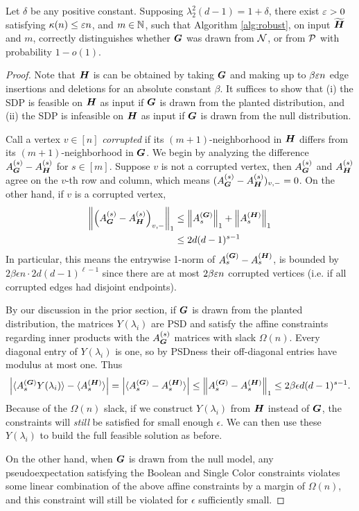\begin{theorem}
    Let $\delta$ be any positive constant. Supposing $\lambda^2_2(d-1) = 1+\delta$, there exist $\varepsilon > 0$ satisfying $\kappa(n)\le\varepsilon n$, and $m \in \mathbb{N}$, such that Algorithm \ref{alg:robust}, on input $\widetilde{\boldsymbol{H}}$ and $m$, correctly distinguishes whether $\boldsymbol{G}$ was drawn from $\mathcal{N}$, or from $\mathcal{P}$ with probability $1-o(1)$.
\end{theorem}
\begin{proof}
	Note that $\boldsymbol{H}$ is can be obtained by taking $\boldsymbol{G}$ and making up to $\beta\varepsilon n$ edge insertions and deletions for an absolute constant $\beta$. It suffices to show that (i) the SDP is feasible on $\boldsymbol{H}$ as input if $\boldsymbol{G}$ is drawn from the planted distribution, and (ii) the SDP is infeasible on $\boldsymbol{H}$ as input if $\boldsymbol{G}$ is drawn from the null distribution.

	Call a vertex $v \in [n]$ \emph{corrupted} if its $(m+1)$-neighborhood in $\boldsymbol{H}$ differs from its $(m+1)$-neighborhood in $\boldsymbol{G}$.  We begin by analyzing the difference $A^{(s)}_{\boldsymbol{G}} -A^{(s)}_{\boldsymbol{H}}$ for $s\in[m]$. Suppose $v$ is not a corrupted vertex, then $A^{(s)}_{\boldsymbol{G}}$ and $A^{(s)}_{\boldsymbol{H}}$ agree on the $v$-th row and column, which means $(A^{(s)}_{\boldsymbol{G}}-A^{(s)}_{\boldsymbol{H}})_{v,-} = 0$. On the other hand, if $v$ is a corrupted vertex,
	\begin{align*}
		\left\|\left(A^{(s)}_{\boldsymbol{G}}-A^{(s)}_{\boldsymbol{H}}\right)_{v,-}\right\|_1 &\le \left\|A^{(\boldsymbol{G})}_{s}\right\|_1 + \left\|A^{(\boldsymbol{H})}_{s}\right\|_1\\
		&\le 2d(d-1)^{s-1}
	\end{align*}
	In particular, this means the entrywise 1-norm of $A^{(\boldsymbol{G})}_{s}-A^{(\boldsymbol{H})}_{s}$, is bounded by $2\beta\epsilon n\cdot 2d(d-1)^{\ell-1}$ since there are at most $2\beta\varepsilon n$ corrupted vertices (i.e. if all corrupted edges had disjoint endpoints).
	
	By our discussion in the prior section, if $\boldsymbol{G}$ is drawn from the planted distribution, the matrices $Y(\lambda_i)$ are PSD and satisfy the affine constraints regarding inner products with the $A^{(s)}_{\boldsymbol{G}}$ matrices with slack $\Omega(n)$. Every diagonal entry of $Y(\lambda_i)$ is one, so by PSDness their off-diagonal entries have modulus at most one. Thus
	$$
        \left|\langle A^{(\boldsymbol{G})}_{s} Y(\lambda_i) \rangle - \langle A^{(\boldsymbol{H})}_{s}\rangle \right| = \left|	\langle A^{(\boldsymbol{G})}_{s} - A^{(\boldsymbol{H})}_{s}\rangle\right| \le \left\|A^{(\boldsymbol{G})}_{s} - A^{(\boldsymbol{H})}_{s}\right\|_1 \le 2\beta\epsilon d(d-1)^{s-1}.
	$$
    Because of the $\Omega(n)$ slack, if we construct $Y(\lambda_i)$ from $\boldsymbol{H}$ instead of $\boldsymbol{G}$, the constraints will \emph{still} be satisfied for small enough $\epsilon$. We can then use these $Y(\lambda_i)$ to build the full feasible solution as before.
    
    On the other hand, when $\boldsymbol{G}$ is drawn from the null model, any pseudoexpectation satisfying the Boolean and Single Color constraints violates some linear combination of the above affine constraints by a margin of $\Omega(n)$, and this constraint will still be violated for $\epsilon$ sufficiently small.
    \end{proof}
